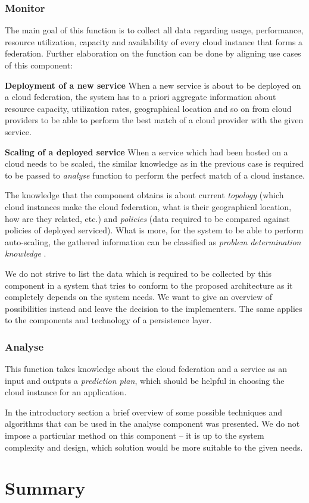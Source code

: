 \subsubsection{Monitor}
The main goal of this function is to collect all data regarding usage, performance, resource utilization, capacity and availability of every cloud instance that forms a federation. Further elaboration on the function can be done by aligning use cases of this component:
\begin{asparaenum}
  \item[\textbf{Deployment of a new service}] When a new service is about to be deployed on a cloud federation, the system has to a priori aggregate information about resource capacity, utilization rates, geographical location and so on from cloud providers to be able to perform the best match of a cloud provider with the given service.
  \item[\textbf{Scaling of a deployed service}] When a service which had been hosted on a cloud needs to be scaled, the similar knowledge as in the previous case is required to be passed to \emph{analyse} function to perform the perfect match of a cloud instance.
\end{asparaenum}

The knowledge that the component obtains is about current \emph{topology} (which cloud instances make the cloud federation, what is their geographical location, how are they related, etc.) and \emph{policies} (data required to be compared against policies of deployed serviced). What is more, for the system to be able to perform auto-scaling, the gathered information can be classified as \emph{problem determination knowledge} \cite{IBM06}.

We do not strive to list the data which is required to be collected by this component in a system that tries to conform to the proposed architecture as it completely depends on the system needs. We want to give an overview of possibilities instead and leave the decision to the implementers. The same applies to the components and technology of a persistence layer.

\subsubsection{Analyse}
This function takes knowledge about the cloud federation and a service as an input and outputs a \emph{prediction plan}, which should be helpful in choosing the cloud instance for an application.

In the introductory section a brief overview of some possible techniques and algorithms that can be used in the analyse component was presented. We do not impose a particular method on this component -- it is up to the system complexity and design, which solution would be more suitable to the given needs.

\section{Summary}
